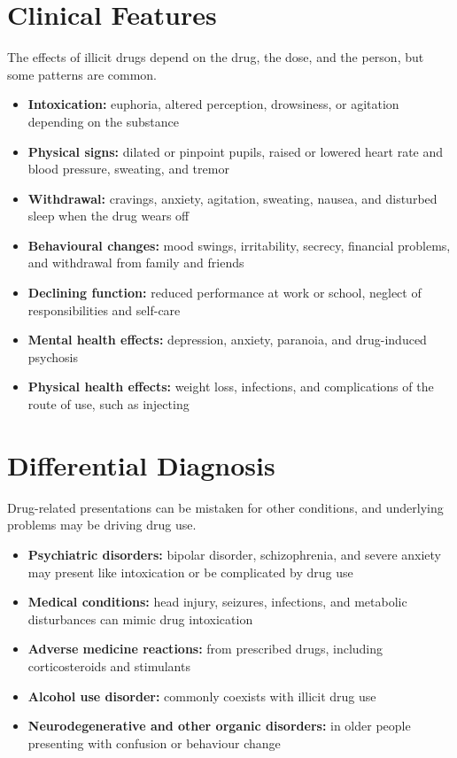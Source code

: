 \section*{Clinical Features}
The effects of illicit drugs depend on the drug, the dose, and the person, but some patterns are common.
\begin{itemize}
    \item \textbf{Intoxication:} euphoria, altered perception, drowsiness, or agitation depending on the substance
    \item \textbf{Physical signs:} dilated or pinpoint pupils, raised or lowered heart rate and blood pressure, sweating, and tremor
    \item \textbf{Withdrawal:} cravings, anxiety, agitation, sweating, nausea, and disturbed sleep when the drug wears off
    \item \textbf{Behavioural changes:} mood swings, irritability, secrecy, financial problems, and withdrawal from family and friends
    \item \textbf{Declining function:} reduced performance at work or school, neglect of responsibilities and self-care
    \item \textbf{Mental health effects:} depression, anxiety, paranoia, and drug-induced psychosis
    \item \textbf{Physical health effects:} weight loss, infections, and complications of the route of use, such as injecting
\end{itemize}

\section*{Differential Diagnosis}
Drug-related presentations can be mistaken for other conditions, and underlying problems may be driving drug use.
\begin{itemize}
    \item \textbf{Psychiatric disorders:} bipolar disorder, schizophrenia, and severe anxiety may present like intoxication or be complicated by drug use
    \item \textbf{Medical conditions:} head injury, seizures, infections, and metabolic disturbances can mimic drug intoxication
    \item \textbf{Adverse medicine reactions:} from prescribed drugs, including corticosteroids and stimulants
    \item \textbf{Alcohol use disorder:} commonly coexists with illicit drug use
    \item \textbf{Neurodegenerative and other organic disorders:} in older people presenting with confusion or behaviour change
\end{itemize}

